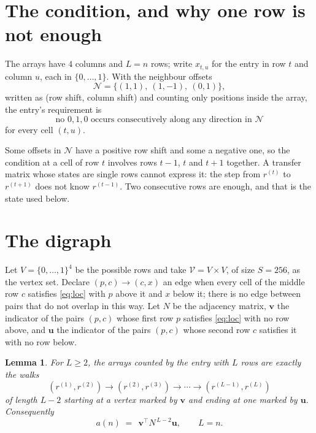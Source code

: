\documentclass[11pt,a4paper]{article}
\theoremstyle{plain}
\newtheorem{lemma}[theorem]{Lemma}
\theoremstyle{definition}
\begin{document}
\section{The condition, and why one row is not enough}

The arrays have $4$ columns and $L=n$ rows; write $x_{t,u}$ for the entry in
row $t$ and column $u$, each in $\{0,\dots,1\}$. With the neighbour offsets
\[
\mathcal N=\{(1,1),\ (1,-1),\ (0,1)\},
\]
written as (row shift, column shift) and counting only positions inside the array, the
entry's requirement is
\begin{equation}\label{eq:loc}
\text{no }0,1,0\text{ occurs consecutively along any direction in }\mathcal N
\end{equation}
for every cell $(t,u)$.

Some offsets in $\mathcal N$ have a positive row shift and some a negative one, so the
condition at a cell of row $t$ involves rows $t-1$, $t$ and $t+1$ together. A transfer
matrix whose states are single rows cannot express it: the step from $r^{(t)}$ to
$r^{(t+1)}$ does not know $r^{(t-1)}$. Two consecutive rows are enough, and that is
the state used below.

\section{The digraph}

Let $V=\{0,\dots,1\}^{4}$ be the possible rows and take
$\mathcal V=V\times V$, of size $S=256$, as the vertex set. Declare $(p,c)\to(c,x)$ an edge
when every cell of the middle row $c$ satisfies \eqref{eq:loc} with $p$ above it and $x$
below it; there is no edge between pairs that do not overlap in this way. Let $N$ be the
adjacency matrix, $\mathbf{v}$ the indicator of the pairs $(p,c)$ whose first row $p$
satisfies \eqref{eq:loc} with no row above, and $\mathbf{u}$ the indicator of
the pairs $(p,c)$ whose second row $c$ satisfies it with no row below.

\begin{lemma}\label{lem:walk}
For $L\ge2$, the arrays counted by the entry with $L$ rows are exactly the walks
\[
(r^{(1)},r^{(2)})\to(r^{(2)},r^{(3)})\to\cdots\to(r^{(L-1)},r^{(L)})
\]
of length $L-2$ starting at a vertex marked by $\mathbf{v}$ and ending at one marked by
$\mathbf{u}$. Consequently
\[
a(n)\;=\;\,\mathbf{v}^{\!\top}N^{\,L-2}\mathbf{u},\qquad L=n .
\]
\end{lemma}
\end{document}
